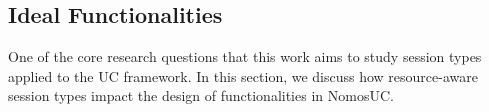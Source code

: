 

\subsection{Ideal Functionalities}
One of the core research questions that this work aims to study session types applied to the UC framework. 
In this section, we discuss how resource-aware session types impact the design of functionalities in NomosUC.

